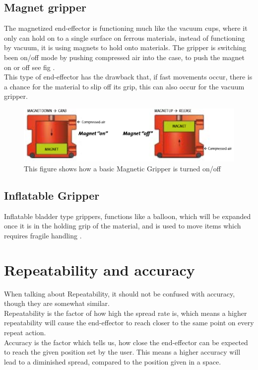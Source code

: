 \subsection{Magnet gripper}
The magnetized end-effector is functioning much like the vacuum cups, where it only can hold on to a single surface on ferrous materials, instead of functioning by vacuum, it is using magnets to hold onto materials. The gripper is switching been on/off mode by pushing compressed air into the case, to push the magnet on or off see fig \cite{MagnetCite}.\\
This type of end-effector has the drawback that, if fast movements occur, there is a chance for the material to slip off its grip, this can also occur for the vacuum gripper\cite{Gripper2}.\\

\begin{figure}[H]
    \centering
    \includegraphics{TechnicalAnlysis/MagnetGripper.PNG}
    \caption{This figure shows how a basic Magnetic Gripper is turned on/off \cite{MagnetCite}}
    \label{fig:MagnetGrip}
\end{figure}

\subsection{Inflatable Gripper}
Inflatable bladder type grippers, functions like a balloon, which will be expanded once it is in the holding grip of the material, and is used to move items which requires fragile handling \cite{Gripper3}.\\

\section{Repeatability and accuracy}
When talking about Repeatability, it should not be confused with accuracy, though they are somewhat similar.\\
Repeatability is the factor of how high the spread rate is, which means a higher repeatability will cause the end-effector to reach closer to the same point on every repeat action.\\
Accuracy is the factor which tells us, how close the end-effector can be expected to reach the given position set by the user. This means a higher accuracy will lead to a diminished spread, compared to the position given in a space\cite{RepeatWhat}.\\


